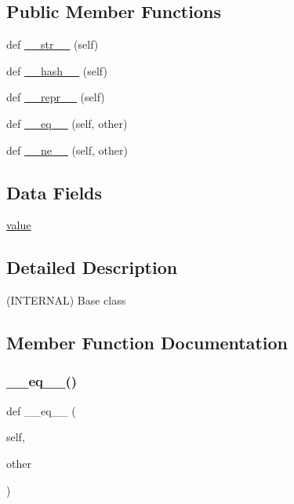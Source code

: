 \subsection*{Public Member Functions}
\begin{DoxyCompactItemize}
\item 
def \hyperlink{classvlc_1_1___enum_a23e8041ce1015febe4fdace3225714f9}{\+\_\+\+\_\+str\+\_\+\+\_\+} (self)
\item 
def \hyperlink{classvlc_1_1___enum_a3195ea87162f33a34d0079931a8194ca}{\+\_\+\+\_\+hash\+\_\+\+\_\+} (self)
\item 
def \hyperlink{classvlc_1_1___enum_a9a47563093dfc5ba12274b66e368920c}{\+\_\+\+\_\+repr\+\_\+\+\_\+} (self)
\item 
def \hyperlink{classvlc_1_1___enum_ad794ff077f2f05f228a7109f3670ac40}{\+\_\+\+\_\+eq\+\_\+\+\_\+} (self, other)
\item 
def \hyperlink{classvlc_1_1___enum_aa0b54a20b36fcc55e1147de88d083072}{\+\_\+\+\_\+ne\+\_\+\+\_\+} (self, other)
\end{DoxyCompactItemize}
\subsection*{Data Fields}
\begin{DoxyCompactItemize}
\item 
\hyperlink{classvlc_1_1___enum_afcc7a4b78ecd8fa7e713f8cfa0f51017}{value}
\end{DoxyCompactItemize}


\subsection{Detailed Description}
\begin{DoxyVerb}(INTERNAL) Base class
\end{DoxyVerb}
 

\subsection{Member Function Documentation}
\mbox{\label{classvlc_1_1___enum_ad794ff077f2f05f228a7109f3670ac40}} 
\subsubsection{\texorpdfstring{\+\_\+\+\_\+eq\+\_\+\+\_\+()}{\_\_eq\_\_()}}
{\footnotesize\ttfamily def \+\_\+\+\_\+eq\+\_\+\+\_\+ (\begin{DoxyParamCaption}\item[{}]{self,  }\item[{}]{other }\end{DoxyParamCaption})}

